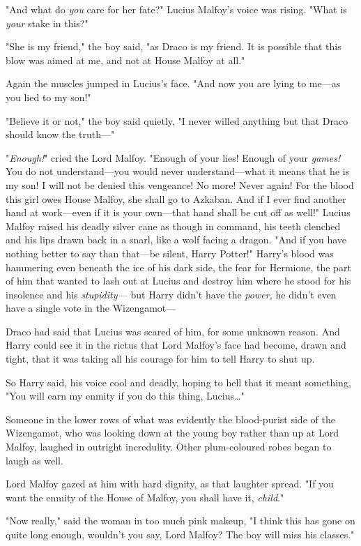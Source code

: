 "And what do \emph{you} care for her fate?" Lucius Malfoy’s voice was rising.
"What is \emph{your} stake in this?"

"She is my friend," the boy said, "as Draco is my friend. It is possible that
this blow was aimed at me, and not at House Malfoy at all."

Again the muscles jumped in Lucius’s face. "And now you are lying to me—as
you lied to my son!"

"Believe it or not," the boy said quietly, "I never willed anything but that
Draco should know the truth—"

"\emph{Enough!}" cried the Lord Malfoy. "Enough of your lies! Enough of your
\emph{games!} You do not understand—you would never understand—what it
means that he is my son! I will not be denied this vengeance! No more! Never
again! For the blood this girl owes House Malfoy, she shall go to Azkaban. And
if I ever find another hand at work—even if it is your own—that hand shall
be cut off as well!" Lucius Malfoy raised his deadly silver cane as though in
command, his teeth clenched and his lips drawn back in a snarl, like a wolf
facing a dragon. "And if you have nothing better to say than that—be silent,
Harry Potter!"
\later
Harry’s blood was hammering even beneath the ice of his dark side, the fear for
Hermione, the part of him that wanted to lash out at Lucius and destroy him
where he stood for his insolence and his \emph{stupidity—} but Harry didn’t
have the \emph{power,} he didn’t even have a single vote in the Wizengamot—

Draco had said that Lucius was scared of him, for some unknown reason. And
Harry could see it in the rictus that Lord Malfoy’s face had become, drawn and
tight, that it was taking all his courage for him to tell Harry to shut up.

So Harry said, his voice cool and deadly, hoping to hell that it meant
something, "You will earn my enmity if you do this thing, Lucius…"

Someone in the lower rows of what was evidently the blood-purist side of the
Wizengamot, who was looking down at the young boy rather than up at Lord
Malfoy, laughed in outright incredulity. Other plum-coloured robes began to
laugh as well.

Lord Malfoy gazed at him with hard dignity, as that laughter spread. "If you
want the enmity of the House of Malfoy, you shall have it, \emph{child}."

"Now really," said the woman in too much pink makeup, "I think this has gone on
quite long enough, wouldn’t you say, Lord Malfoy? The boy will miss his
classes."

